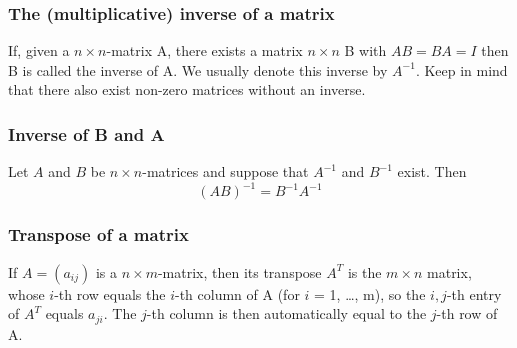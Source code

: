 \documentclass{article}
\begin{document}
			\subsubsection{The (multiplicative) inverse of a matrix}
			If, given a $n\times n$-matrix A, there exists a matrix $n\times n$ B with $AB = BA = I$ then B is called the inverse of A. We usually denote this inverse by $A^{-1}$. Keep in mind that there also exist non-zero matrices without an inverse.
			
			\subsubsection{Inverse of B and A}
			Let $A$ and $B$ be $n \times n$-matrices and suppose that $A^{-1}$ and $B^{-1}$ exist. Then 
			\begin{equation*}
				(AB)^{-1} = B^{-1}A^{-1}
			\end{equation*}
			
			\subsubsection{Transpose of a matrix}
			If $A = (a_{ij})$ is a $n \times m$-matrix, then its transpose $A^T$ is the $m \times n$ matrix, whose $i$-th row equals the $i$-th column of A (for $i$ = 1, \dots, m), so the $i,j$-th entry of $A^T$ equals $a_{ji}$. The $j$-th column is then automatically equal to the $j$-th row of A.
			
			
\end{document}
